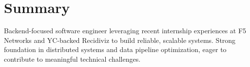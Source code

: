 \section{Summary}
    Backend-focused software engineer leveraging recent internship experiences at F5 Networks and YC-backed Recidiviz to build reliable, scalable systems. Strong foundation in distributed systems and data pipeline optimization, eager to contribute to meaningful technical challenges.


